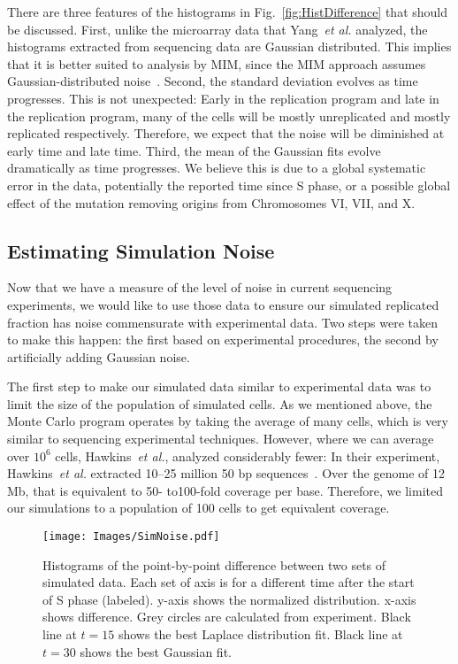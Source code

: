 		There are three features of the histograms in Fig.~\ref{fig:HistDifference} that should be discussed.
		First, unlike the microarray data that Yang~\emph{et al.} analyzed, the histograms extracted from sequencing data are Gaussian distributed.
		This implies that it is better suited to analysis by MIM, since the MIM approach assumes Gaussian-distributed noise~\cite{ScottsPaper}.
		Second, the standard deviation evolves as time progresses.
		This is not unexpected: Early in the replication program and late in the replication program, many of the cells will be mostly unreplicated and mostly replicated  respectively.
		Therefore, we expect that the noise will be diminished at early time and late time.
		Third, the mean of the Gaussian fits evolve dramatically as time progresses.
		We believe this is due to a global systematic error in the data, potentially the reported time since S phase, or a possible global effect of the mutation removing origins from Chromosomes VI, VII, and X.
		
		
		\subsection{Estimating Simulation Noise}
		\label{subsec:SimulationNoise}
		
		Now that we have a measure of the level of noise in current sequencing experiments, we would like to use those data to ensure our simulated replicated fraction has noise commensurate with experimental data.
		Two steps were taken to make this happen: the first based on experimental procedures, the second by artificially adding Gaussian noise.
		
		The first step to make our simulated data similar to experimental data was to limit the size of the population of simulated cells.
		As we mentioned above, the Monte Carlo program operates by taking the average of many cells, which is very similar to sequencing experimental techniques.
		However, where we can average over $10^6$ cells, Hawkins~\emph{et al.}, analyzed considerably fewer:
		In their experiment, Hawkins~\emph{et al.} extracted 10--25 million 50 bp sequences~\cite{StochasticTermination}.
		Over the genome of 12 Mb, that is equivalent to 50- to100-fold coverage per base.
		Therefore, we limited our simulations to a population of 100 cells to get equivalent coverage.
		
		\begin{figure}[tbh]
			\begin{center}
				\texttt{[image: Images/SimNoise.pdf]}
			\end{center}
				\caption[Estimating Simulation Noise]{\label{fig:SimNoise} Histograms of the point-by-point difference between two sets of simulated data.
					Each set of axis is for a different time after the start of S phase (labeled).
					y-axis shows the normalized distribution.
					x-axis shows difference.
					Grey circles are calculated from experiment.
					Black line at $t=15$ shows the best Laplace distribution fit.
					Black line at $t=30$ shows the best Gaussian fit.
				}
		\end{figure}
		
